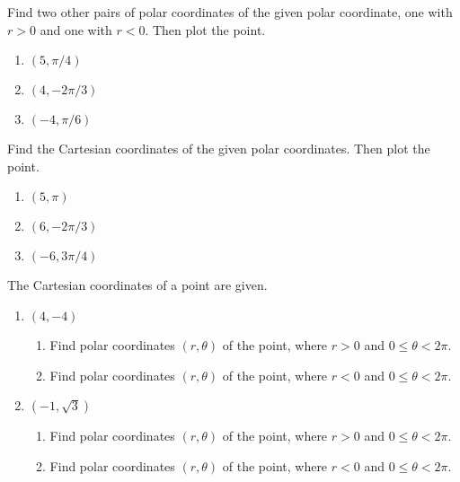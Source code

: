 \begin{problem}[WebAssign HW 33, \# 1]
Find two other pairs of polar coordinates of the given polar coordinate,
one with $r>0$ and one with $r<0$. Then plot the point.
\begin{enumerate}[label=(\alph*)]
\item $(5,\pi/4)$
\item $(4,-2\pi/3)$
\item $(-4,\pi/6)$
\end{enumerate}
\end{problem}
\begin{problem}[WebAssign HW 33, \# 2]
Find the Cartesian coordinates of the given polar coordinates. Then plot
the point.
\begin{enumerate}[label=(\alph*)]
\item $(5,\pi)$
\item $(6,-2\pi/3)$
\item $(-6,3\pi/4)$
\end{enumerate}
\end{problem}
\begin{problem}[WebAssign HW 33, \# 3]
The Cartesian coordinates of a point are given.
\begin{enumerate}[label=(\alph*)]
\item $(4,-4)$
  \begin{enumerate}[label=(\roman*)]
  \item Find polar coordinates $(r,\theta)$ of the point, where $r>0$ and
    $0\leq\theta<2\pi$.
  \item Find polar coordinates $(r,\theta)$ of the point, where $r<0$ and
    $0\leq\theta<2\pi$.
  \end{enumerate}
\item $(-1,\sqrt{3})$
  \begin{enumerate}[label=(\roman*)]
  \item Find polar coordinates $(r,\theta)$ of the point, where $r>0$ and
    $0\leq\theta<2\pi$.
  \item Find polar coordinates $(r,\theta)$ of the point, where $r<0$ and
    $0\leq\theta<2\pi$.
  \end{enumerate}
\end{enumerate}
\end{problem}
